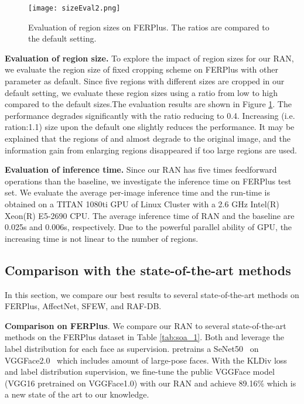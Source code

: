 \documentclass[journal]{IEEEtran}
\newcommand{\rpxj}[1]{\textcolor[rgb]{0,0,0}{#1}}
\begin{document}
\begin{figure}
\center
\texttt{[image: sizeEval2.png]}
\caption{Evaluation of region sizes on FERPlus. The ratios are compared to the default setting.}
\label{fig:sizeEval}
\end{figure}

\textbf{Evaluation of region size.} 
To explore the impact of region sizes for our RAN, we evaluate the region size of fixed cropping scheme on FERPlus with other parameter as default. Since five regions with different sizes are cropped in our default setting, we evaluate these region sizes using a ratio from low to high compared to the default sizes.The evaluation results are shown in Figure \ref{fig:sizeEval}. The performance degrades significantly with the ratio reducing to 0.4. Increasing (i.e. ration:1.1) size upon the default one slightly reduces the performance. It may be explained that the regions of  and  almost degrade to the original image, and the information gain from enlarging regions disappeared if too large regions are used.

\rpxj{\textbf{Evaluation of inference time.}
Since our RAN has five times feedforward operations than the baseline, we investigate the inference time on FERPlus test set.  
We evaluate the average per-image inference time and the run-time is obtained on a TITAN 1080ti GPU of Linux Cluster with a 2.6 GHz Intel(R) Xeon(R) E5-2690 CPU. The average inference time of RAN and the baseline are 0.025s and 0.006s, respectively. Due to the powerful parallel ability of GPU, the increasing time is not linear to the number of regions. 
}





\subsection{Comparison with the state-of-the-art methods}
In this section, we compare our best results to several state-of-the-art methods on FERPlus, AffectNet, SFEW, and RAF-DB.

\textbf{Comparison on FERPlus}.
We compare our RAN to several state-of-the-art methods on the FERPlus dataset in Table \ref{tab:soa_1}. Both \cite{barsoum2016training} and \cite{Albanie18} leverage the label distribution for each face as supervision. \cite{Albanie18} pretrains a SeNet50~\cite{hu2018squeeze} on VGGFace2.0~\cite{cao2018vggface2} which includes amount of large-pose faces. With the KLDiv loss and label distribution supervision, we fine-tune the public VGGFace model (VGG16 pretrained on VGGFace1.0) with our RAN and achieve 89.16\% which is a new state of the art to our knowledge.
\end{document}
